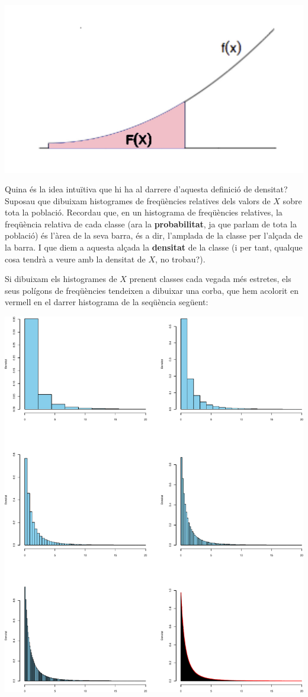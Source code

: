 \documentclass[
]{book}
\theoremstyle{definition}
\theoremstyle{definition}
\theoremstyle{definition}
\theoremstyle{remark}
\begin{document}
\begin{center}\includegraphics[width=0.6\linewidth]{Bioestadistica-II_files/figure-html/graficadensidad3} \end{center}

Quina és la idea intuïtiva que hi ha al darrere d'aquesta definició de densitat? Suposau que dibuixam histogrames de freqüències relatives dels valors de \(X\) sobre tota la població. Recordau que, en un histograma de freqüències relatives, la freqüència relativa de cada classe (ara la \textbf{probabilitat}, ja que parlam de tota la població) és l'àrea de la seva barra, és a dir, l'amplada de la classe per l'alçada de la barra. I que diem a aquesta alçada la \textbf{densitat} de la classe (i per tant, qualque cosa tendrà a veure amb la densitat de \(X\), no trobau?).

Si dibuixam els histogrames de \(X\) prenent classes cada vegada més estretes, els seus polígons de freqüències tendeixen a dibuixar una corba, que hem acolorit en vermell en el darrer histograma de la seqüència següent:

\begin{center}\includegraphics[width=1\linewidth]{Bioestadistica-II_files/figure-latex/unnamed-chunk-57-1} \end{center}
\end{document}
